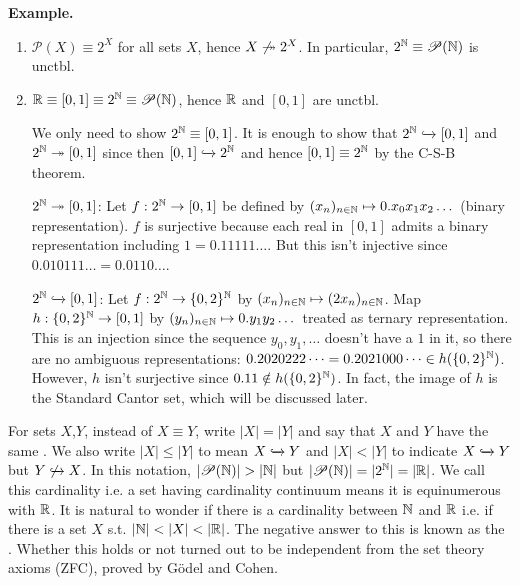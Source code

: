 \documentclass[14pt,oneside]{extarticle}
\newenvironment{example}{
    \par
    \vspace{5pt}
    \noindent\textbf{Example.}
    \begin{tcolorbox}[
        blanker, breakable, left=5mm, parbox=false,
        before upper={\parindent15pt},
        after skip=10pt,
        borderline west={1mm}{0pt}{solarized-magenta!50}]
}{
    \end{tcolorbox}
    \vspace{5pt}
}
\begin{document}
\begin{example}
  \begin{enumerate}[label=$\circ$, leftmargin=*, itemsep=1em]
    \item $\mathscr{P}(X) \equiv 2^X$ for all sets $X$, hence $X \not \twoheadrightarrow{} 2^X$. In particular, $2^{\mathbb{N}} \equiv \mathscr{P}(\mathbb{N})$ is unctbl.
    \item $\mathbb{R} \equiv [0,1] \equiv 2^{\mathbb{N}} \equiv \mathscr{P}(\mathbb{N})$, hence $\mathbb{R}$ and $[0,1]$ are unctbl.
    
    \noindent\soln{} We only need to show $2^{\mathbb{N}} \equiv [0,1]$. It is enough to show that $2^{\mathbb{N}} \xhookrightarrow{} [0,1]$ and $2^{\mathbb{N}} \twoheadrightarrow{} [0,1]$ since then $[0,1] \xhookrightarrow{} 2^{\mathbb{N}}$ and hence $[0,1] \equiv 2^{\mathbb{N}}$ by the C-S-B theorem.

    $2^{\mathbb{N}} \twoheadrightarrow{} [0,1]$: Let $f: 2^{\mathbb{N}} \to [0,1]$ be defined by $(x_n)_{n \in \mathbb{N}} \mapsto 0.x_0x_1x_2\dots$ (binary representation). $f$ is surjective because each real in $[0,1]$ admits a binary representation including $1 = 0.11111\dots$. But this isn't injective since $0.010111\dots = 0.0110\dots$.

    $2^{\mathbb{N}} \xhookrightarrow{} [0,1]$: Let $f:2^{\mathbb{N}} \to \{0,2\}^{\mathbb{N}}$ by $(x_n)_{n \in \mathbb{N}} \mapsto (2x_n)_{n \in \mathbb{N}}$. Map $h: \{0,2\}^{\mathbb{N}} \to [0,1]$ by $(y_n)_{n \in \mathbb{N}} \mapsto 0.y_1y_2\dots$ treated as ternary representation. This is an injection since the sequence $y_0, y_1, \dots$ doesn't have a $1$ in it, so there are no ambiguous representations: $0.2020222\dots = 0.2021000\dots \in h(\{0,2\}^{\mathbb{N}})$. However, $h$ isn't surjective since $0.11 \notin h(\{0,2\}^{\mathbb{N}})$. In fact, the image of $h$ is the Standard Cantor set, which will be discussed later.
  \end{enumerate}
\end{example}

\begin{notation*} 
  For sets $X$,$Y$, instead of $X \equiv Y$, write $|X| =|Y|$ and say that $X$ and $Y$ have the same . We also write $|X| \leq |Y|$ to mean $X \xhookrightarrow{} Y$ and $|X| < |Y|$ to indicate $X \xhookrightarrow{} Y$ but $Y \not \xhookrightarrow{} X$. In this notation, $|\mathscr{P}(\mathbb{N})| > |\mathbb{N}|$ but $|\mathscr{P}(\mathbb{N})| = |2^{\mathbb{N}}| = |\mathbb{R}|$. We call this cardinality  i.e. a set having cardinality continuum means it is equinumerous with $\mathbb{R}$. It is natural to wonder if there is a cardinality between $\mathbb{N}$ and $\mathbb{R}$ i.e. if there is a set $X$ s.t. $|\mathbb{N}| < |X| < |\mathbb{R}|$. The negative answer to this is known as the . Whether this holds or not turned out to be independent from the set theory axioms (ZFC), proved by G\"{o}del and Cohen.
\end{notation*}
\end{document}
